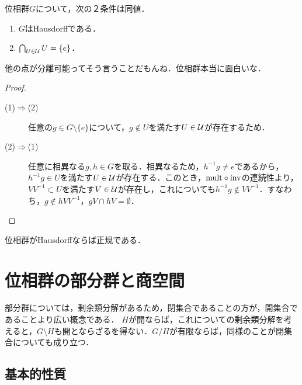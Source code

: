 \documentclass[uplatex,dvipdfmx]{jsreport}
\begin{document}
\begin{proposition}[ハウスドルフ位相群の特徴付け]\label{prop-characterization-of-Hausdorff-group}
    位相群$G$について，次の２条件は同値．
    \begin{enumerate}
        \item $G$はHausdorffである．
        \item $\bigcap_{U\in\mathcal{U}}U=\{e\}$．
    \end{enumerate}
\end{proposition}
\begin{remarks}
    他の点が分離可能ってそう言うことだもんね．位相群本当に面白いな．
\end{remarks}
\begin{proof}\mbox{}
    \begin{description}
        \item[(1)$\Rightarrow$(2)] 任意の$g\in G\setminus\{e\}$について，$g\notin U$を満たす$U\in\mathcal{U}$が存在するため．
        \item[(2)$\Rightarrow$(1)] 任意に相異なる$g,h\in G$を取る．相異なるため，$h^{-1}g\ne e$であるから，$h^{-1}g\in U$を満たす$U\in\mathcal{U}$が存在する．このとき，$\mathrm{mult}\circ\mathrm{inv}$の連続性より，$VV^{-1}\subset U$を満たす$V\in\mathcal{U}$が存在し，これについても$h^{-1}g\notin VV^{-1}$．すなわち，$g\notin hVV^{-1}$，$gV\cap hV=\emptyset$．
    \end{description}
\end{proof}

\begin{proposition}[Kolmogorov]
    位相群がHausdorffならば正規である．
\end{proposition}

\section{位相群の部分群と商空間}

\begin{tcolorbox}[colframe=ForestGreen, colback=ForestGreen!10!white,breakable,colbacktitle=ForestGreen!40!white,coltitle=black,fonttitle=\bfseries\sffamily,
title=]
    部分群については，剰余類分解があるため，閉集合であることの方が，開集合であることより広い概念である．
    $H$が開ならば，これについての剰余類分解を考えると，$G\setminus H$も開とならざるを得ない．$G/H$が有限ならば，同様のことが閉集合についても成り立つ．
\end{tcolorbox}

\subsection{基本的性質}
\end{document}
